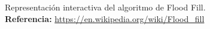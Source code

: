 Representación interactiva del algoritmo de Flood Fill. \\
\textbf{Referencia:} \url{https://en.wikipedia.org/wiki/Flood_fill}